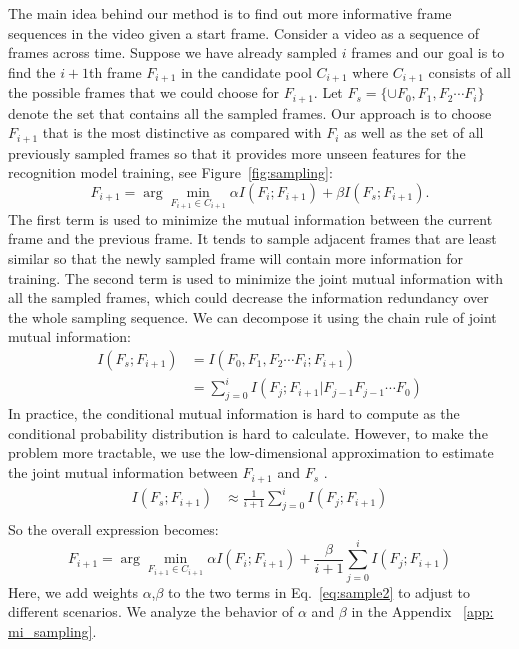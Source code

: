 \documentclass[10pt,twocolumn,letterpaper]{article}
\begin{document}
{The main idea behind our method is to find out more informative frame sequences in the video given a start frame. Consider a video as a sequence of frames across time. Suppose we have already sampled $i$ frames and our goal is to find the $i+1$th frame $F_{i+1}$ in the candidate pool $C_{i+1}$ where $C_{i+1}$ consists of all the possible frames that we could choose for $F_{i+1}$. Let $F_s = \{\cup F_0, F_1, F_2 \cdots F_i\}$ denote the set that contains all the sampled frames. Our approach is to choose $F_{i+1}$ that is the most distinctive as compared with $F_i$ as well as the set of all previously sampled frames so that it provides more unseen features for the recognition model training, see Figure~\ref{fig:sampling}:
\begin{equation}\label{eq:sampling}
    F_{i+1} = \arg \min_{F_{i+1}\in C_{i+1}} \alpha I(F_i;F_{i+1}) + \beta I(F_s;F_{i+1}).
\end{equation}
The first term is used to minimize the mutual information between the current frame and the previous frame. It tends to sample adjacent frames that are least similar so that the newly sampled frame will contain more information for training. 
The second term is used to minimize the joint mutual information with all the sampled frames, which could decrease the information redundancy over the whole sampling sequence. We can decompose it using the chain rule of joint mutual information:
\begin{equation}\label{eq:sampling2}
\begin{split}
         I(F_s;F_{i+1}) &= I(F_0,F_1,F_2 \cdots F_i;F_{i+1})\\
         &= \sum_{j=0}^i I(F_j;F_{i+1}|F_{j-1}F_{j-1}\cdots F_{0})
\end{split}
\end{equation}
In practice, the conditional mutual information is hard to compute as the conditional probability distribution is hard to calculate. However, to make the problem more tractable, we use the low-dimensional approximation to estimate the joint mutual information between $F_{i+1}$ and $F_s$ \cite{Gao2017EstimatingMI,JMLR:v13:brown12a}.
\begin{equation}
\begin{split}
         I(F_s;F_{i+1})&\approx \frac{1}{i+1}\sum_{j=0}^i I(F_j;F_{i+1})\\
\end{split}
\end{equation}
So the overall expression becomes:
\begin{equation}\label{eq:sample2}
    F_{i+1} = \arg \min_{F_{i+1}\in C_{i+1}} \alpha I(F_i;F_{i+1}) + \frac{\beta}{i+1} \sum_{j=0}^i I(F_j;F_{i+1})
\end{equation}
Here, we add weights $\alpha$,$\beta$ to the two terms in Eq.~\ref{eq:sample2} to adjust to different scenarios. We analyze the behavior of $\alpha$ and $\beta$ in the Appendix ~\ref{app: mi_sampling}.

}
\end{document}
